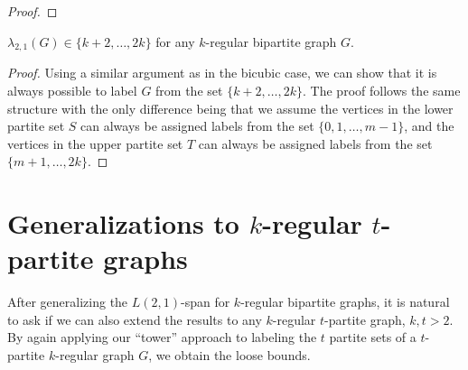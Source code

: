 \documentclass[12pt]{article}
\begin{document}
\begin{proof}

\end{proof}

\begin{cor}
$\lambda_{2,1}(G) \in \{k + 2,\dots, 2k\}$ for any $k$-regular bipartite graph $G$. 
\end{cor}
\begin{proof}
Using a similar argument as in the bicubic case, we can show that it is always possible to label $G$ from the set $\{k + 2,\dots, 2k\}$. The proof follows the same structure with the only difference being that we assume the vertices in the lower partite set $S$ can always be assigned labels from the set $\{0,1,\dots,m - 1\}$, and the vertices in the upper partite set $T$ can always be assigned labels from the set $\{m + 1,\dots,2k\}$. 
\end{proof}

\section{Generalizations to $k$-regular $t$-partite graphs}

After generalizing the $L(2,1)$-span for $k$-regular bipartite graphs, it is natural to ask if we can also extend the results to any $k$-regular $t$-partite graph, $k,t > 2$. By again applying our ``tower'' approach to labeling the $t$ partite sets of a $t$-partite $k$-regular graph $G$, we obtain the loose bounds.

\end{document}

